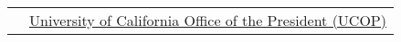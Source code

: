 \documentclass[margin,line]{res}
\begin{document}
\begin{resume}
\begin{longtable}{@{}p{0.7in}p{4in}}
\hspace*{-4mm} \hspace*{-4mm} & \hspace{4mm} \href{https://www.ucop.edu/}{University of California Office of the President (UCOP)}\\
\end{longtable}


\end{resume}
\end{document}
